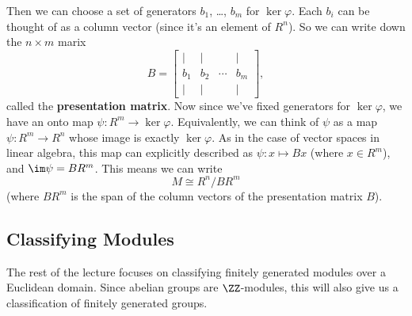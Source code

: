 Then we can choose a set of generators $b_1$, \ldots, $b_m$ for $\ker \varphi$. Each $b_i$ can be thought of as a column vector (since it's an element of $R^n$). So we can write down the $n \times m$ marix \[B = \begin{bmatrix} \vert & \vert &  & \vert \\ b_1 & b_2 & \cdots & b_m \\ \vert & \vert & & \vert \end{bmatrix},\] called the \textbf{presentation matrix}. Now since we've fixed generators for $\ker \varphi$, we have an onto map $\psi : R^m \to \ker \varphi$. Equivalently, we can think of $\psi$ as a map $\psi : R^m \to R^n$ whose image is exactly $\ker \varphi$. As in the case of vector spaces in linear algebra, this map can explicitly described as $\psi : x \mapsto Bx$ (where $x \in R^m$), and $\im \psi = BR^m$. This means we can write \[M \cong R^n/BR^m\] (where $BR^m$ is the span of the column vectors of the presentation matrix $B$). 




\subsection{Classifying Modules}

The rest of the lecture focuses on classifying finitely generated modules over a Euclidean domain. Since abelian groups are $\ZZ$-modules, this will also give us a classification of finitely generated groups. 

